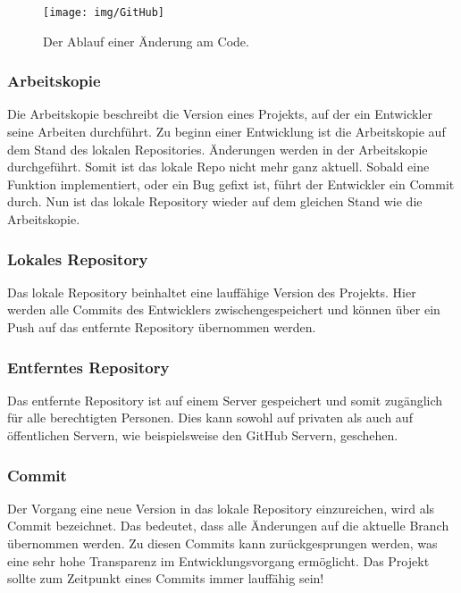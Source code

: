 \documentclass[FIPLY_base.tex]{subfiles}
\begin{document}
\begin{wrapfigure}{r}{0.20\textwidth}
\begin{center}
	\texttt{[image: img/GitHub]}
	\caption{Der Ablauf einer Änderung am Code.}
	\vspace{-90pt}
\end{center}
\end{wrapfigure}

\subsubsection{Arbeitskopie}
Die Arbeitskopie beschreibt die Version eines Projekts, auf der ein Entwickler seine Arbeiten durchführt.
Zu beginn einer Entwicklung ist die Arbeitskopie auf dem Stand des lokalen Repositories.
Änderungen werden in der Arbeitskopie durchgeführt. Somit ist das lokale Repo nicht mehr ganz aktuell.
Sobald eine Funktion implementiert, oder ein Bug gefixt ist, führt der Entwickler ein Commit durch.
Nun ist das lokale Repository wieder auf dem gleichen Stand wie die Arbeitskopie.

\subsubsection{Lokales Repository}
Das lokale Repository beinhaltet eine lauffähige Version des Projekts.
Hier werden alle Commits des Entwicklers zwischengespeichert und können über ein Push auf das entfernte Repository übernommen werden.

\subsubsection{Entferntes Repository}
Das entfernte Repository ist auf einem Server gespeichert und somit zugänglich für alle berechtigten Personen.
Dies kann sowohl auf privaten als auch auf öffentlichen Servern, wie beispielsweise den GitHub Servern, geschehen.

\subsubsection{Commit}
Der Vorgang eine neue Version in das lokale Repository einzureichen, wird als Commit bezeichnet.
Das bedeutet, dass alle Änderungen auf die aktuelle Branch übernommen werden.
Zu diesen Commits kann zurückgesprungen werden, was eine sehr hohe Transparenz im Entwicklungsvorgang ermöglicht.
Das Projekt sollte zum Zeitpunkt eines Commits immer lauffähig sein! 
 
\end{document}
